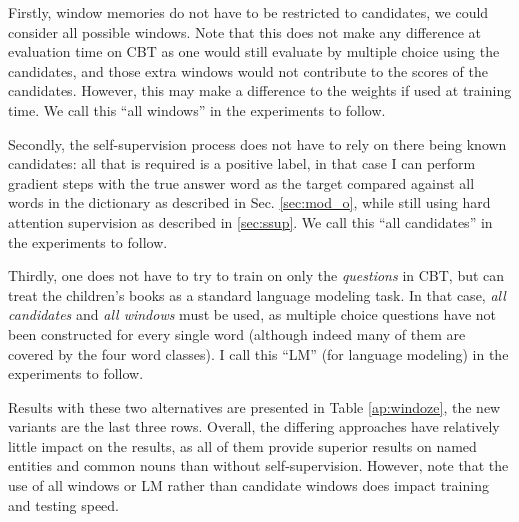 Firstly, window memories do not have to be restricted to candidates, we could consider all possible windows.
Note that this does not make any difference at evaluation time on CBT as one would still evaluate by multiple choice using the candidates, and those extra windows would not contribute to the scores of the candidates.
However, this may make a difference to the weights if used at training time.
We call this ``all windows'' in the experiments to follow.

Secondly, the self-supervision process does not have to rely on there being known candidates:
all that is required is a positive label, in that case I can perform gradient steps with
the true answer word as the target compared against all words in the dictionary as described in Sec. \ref{sec:mod_o}, 
while still using hard attention supervision as described in \ref{sec:ssup}. 
We call this ``all candidates'' in the experiments to follow.

Thirdly, one does not have to try to train on only the {\em questions} in CBT, but can treat the children's 
books as a standard 
language modeling task. In that case, {\em all candidates} and {\em all windows} must be used, as multiple choice questions have not been constructed for every single word (although indeed many of them are covered by the four word classes). I call
this ``LM'' (for language modeling) in the experiments to follow.

Results with these two alternatives are presented in Table \ref{ap:windoze}, the new variants are the last three rows.
Overall, the differing approaches have relatively little impact on the results, as all of them provide superior
results on named entities and common nouns than without self-supervision.
However, note that 
the use of all windows or LM rather than candidate windows does impact training and testing speed.


